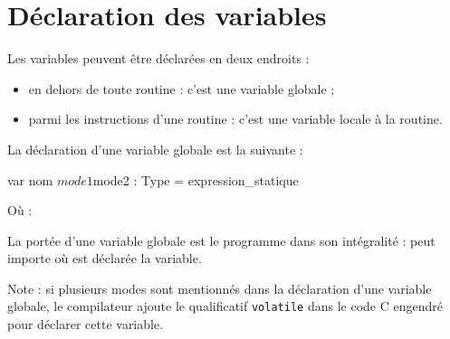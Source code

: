 




\chapter{Déclaration des variables}

Les variables peuvent être déclarées en deux endroits :
\begin{itemize}
  \item en dehors de toute routine : c'est une variable globale ;
  \item parmi les instructions d'une routine : c'est une variable locale à la routine.
\end{itemize}






La déclaration d'une variable globale est la suivante :

\begin{PLM}
var nom $mode1 $mode2 : Type = expression_statique
\end{PLM}

Où :

La portée d'une variable globale est le programme dans son intégralité : peut importe où est déclarée la variable.

Note : si plusieurs modes sont mentionnés dans la déclaration d'une variable globale, le compilateur ajoute le qualificatif \texttt{volatile} dans le code C engendré pour déclarer cette variable.




